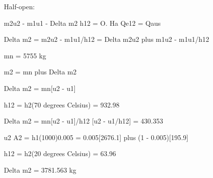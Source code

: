 Half-open:

m2u2 - m1u1 - Delta m2 h12 = O. Ha Qe12 = Qaus

Delta m2 = m2u2 - m1u1/h12 = Delta m2u2 plus m1u2 - m1u1/h12

mn = 5755 kg

m2 = mn plus Delta m2

Delta m2 = mn[u2 - u1]

h12 = h2(70 degrees Celsius) = 932.98

Delta m2 = mn[u2 - u1]/h12 [u2 - u1/h12] = 430.353

u2 A2 = h1(1000)0.005 = 0.005[2676.1] plus (1 - 0.005)[195.9]

h12 = h2(20 degrees Celsius) = 63.96

Delta m2 = 3781.563 kg